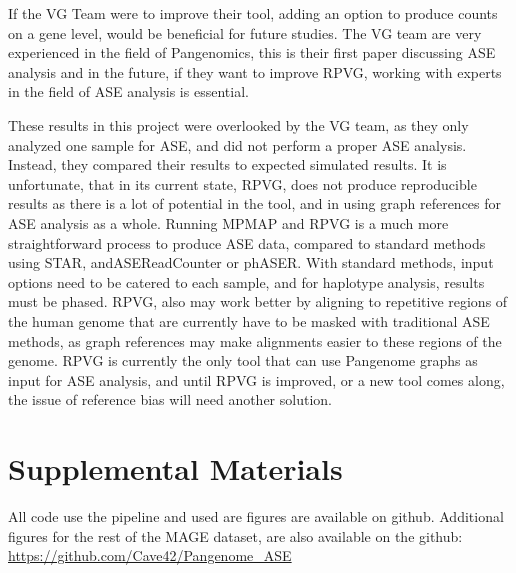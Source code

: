 \documentclass{article}
\begin{document}
If the VG Team
were to improve their tool, adding an option to produce counts on a gene level, would be 
beneficial for future studies. The VG team are very experienced in the field of Pangenomics,
this is their first paper discussing ASE analysis and in the future, if they want to improve
RPVG, working with experts in the field of ASE analysis is essential.

These results in this project were overlooked by the VG team, as they only analyzed one sample for ASE, and 
did not perform a proper ASE analysis. Instead, they compared their results to expected
simulated results. It is unfortunate, that in its current state, RPVG, does not produce
reproducible results as there is a lot of potential in the tool, and in using graph references for ASE 
analysis as a whole. 
Running MPMAP and RPVG is a much more straightforward process to produce ASE data, compared to standard methods
using STAR, andASEReadCounter or phASER. With standard methods, input options need to be 
catered to each sample, and for haplotype analysis, results must be phased. 
RPVG, also may work better by aligning to repetitive regions of the human genome
that are currently have to be masked with traditional ASE methods, as
graph references may make alignments easier to these regions of the genome. 
RPVG is currently the only tool that can use Pangenome graphs as input for ASE analysis, and
until RPVG is improved, or a new tool comes along, the issue of reference bias will need
another solution.

\vspace{35em}

\section{Supplemental Materials}

All code use the pipeline and used are figures are available on github.
Additional figures for the rest of the MAGE dataset, are also available on the github: \\
\url{https://github.com/Cave42/Pangenome_ASE}
\end{document}

